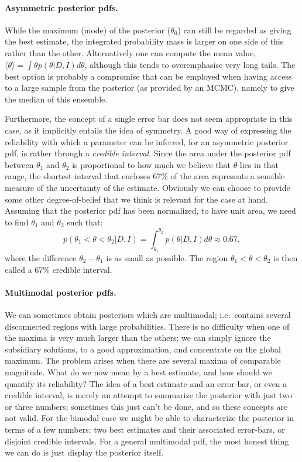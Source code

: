 \documentclass[%
oneside,                 %
final,                   %
10pt]{article}
\begin{document}
\paragraph{Asymmetric posterior pdfs.}
While the maximum (mode) of the posterior ($\theta_0$) can still be regarded as giving the best estimate, the integrated probability mass is larger on one side of this rather than the other. Alternatively one can compute the mean value, $\langle \theta \rangle = \int \theta p(\theta|D,I) d\theta$, although this tends to overemphasise very long tails. The best option is probably a compromise that can be employed when having access to a large sample from the posterior (as provided by an MCMC), namely to give the median of this ensemble.

Furthermore, the concept of a single error bar does not seem appropriate in this case, as it implicitly entails the idea of symmetry. A good way of expressing the reliability with which a parameter can be inferred, for an asymmetric posterior pdf, is rather through a \emph{credible interval}. Since the area under the posterior pdf between $\theta_1$ and $\theta_2$ is proportional to how much we believe that $\theta$ lies in that range, the shortest interval that encloses 67\% of the area represents a sensible measure of the uncertainty of the estimate. Obviously we can choose to provide some other degree-of-belief that we think is relevant for the case at hand. Assuming that the posterior pdf has been normalized, to have unit area, we need to find $\theta_1$ and $\theta_2$ such that: 
\[
p(\theta_1 < \theta < \theta_2 | D,I) = \int_{\theta_1}^{\theta_2} p(\theta|D,I) d\theta \approx 0.67, 
\]
where the difference $\theta_2 - \theta_1$ is as small as possible. The region $\theta_1 < \theta < \theta_2$ is then called a 67\% credible interval. 

\paragraph{Multimodal posterior pdfs.}
We can sometimes obtain posteriors which are multimodal; i.e.~contains several disconnected regions with large probabilities. There is no difficulty when one of the maxima is very much larger than the others: we can simply ignore the subsidiary solutions, to a good approximation, and concentrate on the global maximum. The problem arises when there are several maxima of comparable magnitude. What do we now mean by a best estimate, and how should we quantify its reliability? The idea of a best estimate and an error-bar, or even a credible interval, is merely an attempt to summarize the posterior with just two or three numbers; sometimes this just can’t be done, and so these concepts are not valid. For the bimodal case we might be able to characterize the posterior in terms of a few numbers: two best estimates and their associated error-bars, or disjoint credible intervals. For a general multimodal pdf, the most honest thing we can do is just display the posterior itself.
\end{document}
